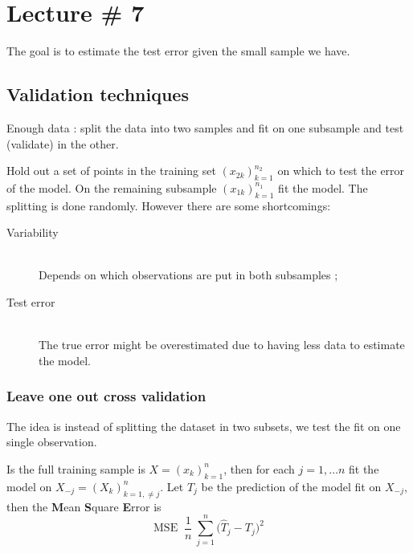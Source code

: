 \documentclass[a4paper]{article}
\newcommand{\brac}[1]{{\left ( #1 \right )}}
\newcommand{\defn}{\mathop{\overset{\Delta}{=}}\nolimits}
\begin{document}



\section{Lecture \# 7} %
\label{sec:lecture_7}

The goal is to estimate the test error given the small sample we have.

\subsection{Validation techniques} %
\label{sub:validation_techniques}

Enough data : split the data into two samples and fit on one subsample and test (validate) in the other.

Hold out a set of points in the training set $\brac{x_{2k}}_{k=1}^{n_2}$ on which to test the error of the model.
On the remaining subsample $\brac{x_{1k}}_{k=1}^{n_1}$ fit the model. The splitting is done randomly.
However there are some shortcomings:
\begin{description}
	\item[Variability] \hfill\\
		Depends on which observations are put in both subsamples ;
	\item[Test error] \hfill\\
		The true error might be overestimated due to having less data to estimate the model.
\end{description}

\subsubsection{Leave one out cross validation} %
\label{ssub:leave_one_out_cross_validation}

The idea is instead of splitting the dataset in two subsets, we test the fit on one single observation.

Is the full training sample is $X=\brac{x_k}_{k=1}^n$, then for each $j=1,\ldots n$ fit the model on $X_{-j} = \brac{X_k}_{k=1,\neq j}^n$.
Let $\hat{T}_j$ be the prediction of the model fit on $X_{-j}$, then the \textbf{M}ean \textbf{S}quare \textbf{E}rror is 
\[\text{MSE} \defn \frac{1}{n}\ \sum_{j=1}^n \big(\hat{T}_j - T_j\big)^2 \]
\end{document}
